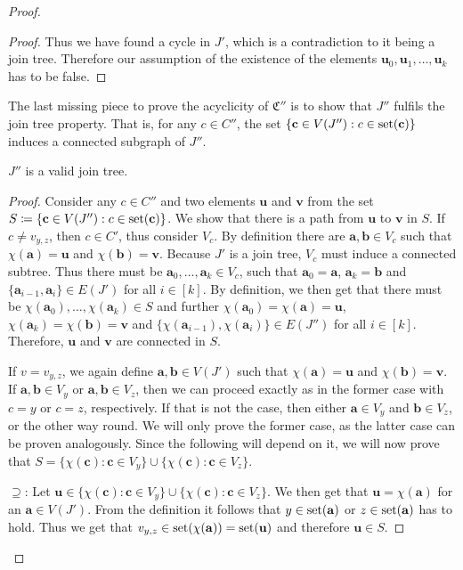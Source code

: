 \begin{proof}
\begin{proof}
		Thus we have found a cycle in $J'$, which is a contradiction to it being a join tree.
		Therefore our assumption of the existence of the elements $\mathbf u_0,\mathbf u_1,\dots,\mathbf u_k$ has to be false.
	\end{proof}
	
	The last missing piece to prove the acyclicity of $\mathfrak C''$ is to show that $J''$ fulfils the join tree property.
	That is, for any $c\in C''$, the set $\{\mathbf c\in V(J'') : c\in\operatorname{set}(\mathbf c)\}$ induces a connected subgraph of $J''$.
	
	\begin{claim}
		$J''$ is a valid join tree.
	\end{claim}
	\begin{proof}
		Consider any $c\in C''$ and two elements $\mathbf u$ and $\mathbf v$ from the set $S\coloneqq \{\mathbf c \in V(J'') : c\in \operatorname{set}(\mathbf c)\}$.
		We show that there is a path from $\mathbf u$ to $\mathbf v$ in $S$.
		If $c\neq v_{y,z}$, then $c\in C'$, thus consider $V_c$.
		By definition there are $\mathbf a,\mathbf b\in V_c$ such that $\chi(\mathbf a)=\mathbf u$ and $\chi(\mathbf b)=\mathbf v$.
		Because $J'$ is a join tree, $V_c$ must induce a connected subtree.
		Thus there must be $\mathbf a_0,\dots,\mathbf a_k\in V_c$, such that $\mathbf a_0=\mathbf a$, $\mathbf a_k=\mathbf b$ and $\{\mathbf a_{i-1},\mathbf a_i\}\in E(J')$ for all $i\in [k]$.
		By definition, we then get that there must be $\chi(\mathbf a_0),\dots,\chi(\mathbf a_k)\in S$ and further $\chi(\mathbf a_0)=\chi(\mathbf a)=\mathbf u$, $\chi(\mathbf a_k)=\chi(\mathbf b)=\mathbf v$ and $\{\chi(\mathbf a_{i-1}),\chi(\mathbf a_i)\}\in E(J'')$ for all $i\in[k]$.
		Therefore, $\mathbf u$ and $\mathbf v$ are connected in $S$.
		
		If $v=v_{y,z}$, we again define $\mathbf a,\mathbf b\in V(J')$ such that $\chi(\mathbf a)=\mathbf u$ and $\chi(\mathbf b)=\mathbf v$.
		If $\mathbf a,\mathbf b\in V_y$ or $\mathbf a,\mathbf b\in V_z$, then we can proceed exactly as in the former case with $c=y$ or $c=z$, respectively.
		If that is not the case, then either $\mathbf a\in V_y$ and $\mathbf b\in V_z$, or the other way round.
		We will only prove the former case, as the latter case can be proven analogously.
		Since the following will depend on it, we will now prove that $S=\{\chi(\mathbf c) : \mathbf c\in V_y\}\cup \{\chi(\mathbf c) : \mathbf c\in V_z\}$.
		
		$\supseteq$:
		Let $\mathbf u \in \{\chi(\mathbf c) : \mathbf c\in V_y\}\cup \{\chi(\mathbf c) : \mathbf c\in V_z\}$.
		We then get that $\mathbf u = \chi(\mathbf a)$ for an $\mathbf a\in V(J')$.
		From the definition it follows that $y\in \operatorname{set}(\mathbf a)$ or $z\in \operatorname{set}(\mathbf a)$ has to hold.
		Thus we get that $v_{y,z}\in \operatorname{set}(\chi(\mathbf a))=\operatorname{set}(\mathbf u)$ and therefore $\mathbf u\in S$.
		

\end{proof}
\end{proof}
